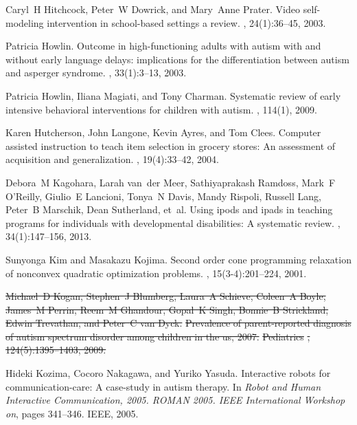 \documentclass{ut-thesis}
\providecommand{\DIFdeltex}[1]{{\protect\color{red}\sout{#1}}}                      %
\providecommand{\DIFdelbegin}{} %
\providecommand{\DIFdelend}{} %
\providecommand{\DIFdel}[1]{\texorpdfstring{\DIFdeltex{#1}}{}} %
\begin{document}
\begin{thebibliography}{100}
Caryl~H Hitchcock, Peter~W Dowrick, and Mary~Anne Prater.
\newblock Video self-modeling intervention in school-based settings a review.
, 24(1):36--45, 2003.

Patricia Howlin.
\newblock Outcome in high-functioning adults with autism with and without early
  language delays: implications for the differentiation between autism and
  asperger syndrome.
, 33(1):3--13,
  2003.

Patricia Howlin, Iliana Magiati, and Tony Charman.
\newblock Systematic review of early intensive behavioral interventions for
  children with autism.
, 114(1), 2009.

Karen Hutcherson, John Langone, Kevin Ayres, and Tom Clees.
\newblock Computer assisted instruction to teach item selection in grocery
  stores: An assessment of acquisition and generalization.
, 19(4):33--42, 2004.

Debora~M Kagohara, Larah van~der Meer, Sathiyaprakash Ramdoss, Mark~F
  O’Reilly, Giulio~E Lancioni, Tonya~N Davis, Mandy Rispoli, Russell Lang,
  Peter~B Marschik, Dean Sutherland, et~al.
\newblock Using ipods{\textregistered} and ipads{\textregistered} in teaching
  programs for individuals with developmental disabilities: A systematic
  review.
, 34(1):147--156, 2013.

Sunyonga Kim and Masakazu Kojima.
\newblock Second order cone programming relaxation of nonconvex quadratic
  optimization problems.
, 15(3-4):201--224, 2001.
\DIFdelbegin %

\DIFdel{Michael~D Kogan, Stephen~J Blumberg, Laura~A Schieve, Coleen~A Boyle, James~M
  Perrin, Reem~M Ghandour, Gopal~K Singh, Bonnie~B Strickland, Edwin Trevathan,
  and Peter~C van Dyck.
}%
\DIFdel{Prevalence of parent-reported diagnosis of autism spectrum disorder
  among children in the us, 2007.
}%
\DIFdel{Pediatrics}%
\DIFdel{, 124(5):1395--1403, 2009.
}\DIFdelend 

Hideki Kozima, Cocoro Nakagawa, and Yuriko Yasuda.
\newblock Interactive robots for communication-care: A case-study in autism
  therapy.
\newblock In {\em Robot and Human Interactive Communication, 2005. ROMAN 2005.
  IEEE International Workshop on}, pages 341--346. IEEE, 2005.


\end{thebibliography}
\end{document}
